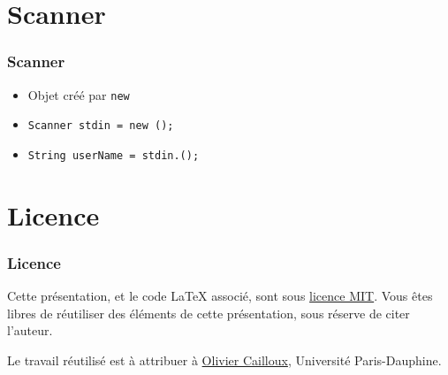 \documentclass[english, french]{beamer}
\begin{document}
\section{Scanner}
\begin{frame}
	\frametitle{Scanner}
	\begin{itemize}
		\item Objet créé par \texttt{new}
		\item \texttt{Scanner stdin = new ();}
		\item \texttt{String userName = stdin.();}
	\end{itemize}
\end{frame}

\appendix

\section{Licence}
\begin{frame}
	\frametitle{Licence}
	Cette présentation, et le code LaTeX associé, sont sous \href{http://opensource.org/licenses/MIT}{licence MIT}. Vous êtes libres de réutiliser des éléments de cette présentation, sous réserve de citer l’auteur.
	
	Le travail réutilisé est à attribuer à \href{http://www.lamsade.dauphine.fr/~ocailloux/}{Olivier Cailloux}, Université Paris-Dauphine.
\end{frame}
\end{document}
